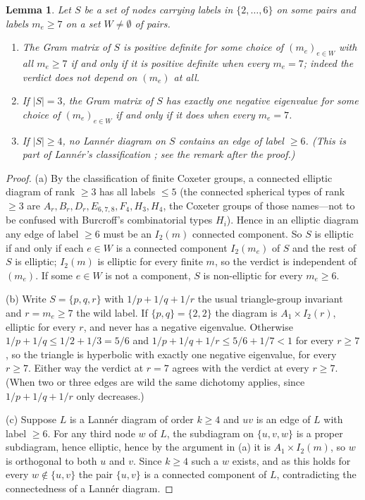 \documentclass[11pt,reqno]{amsart}
\theoremstyle{plain}
\newtheorem{lemma}[theorem]{Lemma}
\theoremstyle{definition}
\begin{document}
\begin{lemma}
\label{lem:wildcard}
Let $S$ be a set of nodes carrying labels in $\{2,\dots,6\}$ on some pairs and
labels $m_e\ge7$ on a set $W\neq\emptyset$ of pairs.
\begin{enumerate}
\item[(a)] The Gram matrix of $S$ is positive definite for some choice of
$(m_e)_{e\in W}$ with all $m_e\ge7$ if and only if it is positive definite when
every $m_e=7$; indeed the verdict does not depend on $(m_e)$ at all.
\item[(b)] If $|S|=3$, the Gram matrix of $S$ has exactly one negative
eigenvalue for some choice of $(m_e)_{e\in W}$ if and only if it does when every
$m_e=7$.
\item[(c)] If $|S|\ge4$, no Lann\'er diagram on $S$ contains an edge of label
$\ge6$. \emph{(This is part of Lann\'er's classification
\cite{Lanner1950}; see the remark after the proof.)}
\end{enumerate}
\end{lemma}
\begin{proof}
(a) By the classification of finite Coxeter groups, a connected elliptic diagram
of rank $\ge3$ has all labels $\le5$ (the connected spherical types of rank
$\ge3$ are $A_r,B_r,D_r,E_{6,7,8},F_4,H_3,H_4$, the Coxeter groups of those
names---not to be confused with Burcroff's combinatorial types $H_i$). Hence in an elliptic diagram
any edge of label $\ge6$ must be an $I_2(m)$ connected component. So $S$ is
elliptic if and only if each $e\in W$ is a connected component $I_2(m_e)$ of $S$
and the rest of $S$ is elliptic; $I_2(m)$ is elliptic for every finite $m$, so
the verdict is independent of $(m_e)$. If some $e\in W$ is not a component, $S$
is non-elliptic for every $m_e\ge6$.

(b) Write $S=\{p,q,r\}$ with $1/p+1/q+1/r$ the usual triangle-group invariant
and $r=m_e\ge7$ the wild label. If $\{p,q\}=\{2,2\}$ the diagram is
$A_1\times I_2(r)$, elliptic for every $r$, and never has a negative
eigenvalue. Otherwise $1/p+1/q\le 1/2+1/3=5/6$ and
$1/p+1/q+1/r\le 5/6+1/7<1$ for every $r\ge7$, so the triangle is hyperbolic
with exactly one negative eigenvalue, for every $r\ge7$. Either way the verdict
at $r=7$ agrees with the verdict at every $r\ge7$. (When two or three edges are
wild the same dichotomy applies, since $1/p+1/q+1/r$ only decreases.)

(c) Suppose $L$ is a Lann\'er diagram of order $k\ge4$ and $uv$ is an edge of
$L$ with label $\ge6$. For any third node $w$ of $L$, the subdiagram on
$\{u,v,w\}$ is a proper subdiagram, hence elliptic, hence by the argument in
(a) it is $A_1\times I_2(m)$, so $w$ is orthogonal to both $u$ and $v$. Since
$k\ge4$ such a $w$ exists, and as this holds for every $w\notin\{u,v\}$ the
pair $\{u,v\}$ is a connected component of $L$, contradicting the connectedness
of a Lann\'er diagram.
\end{proof}
\end{document}
